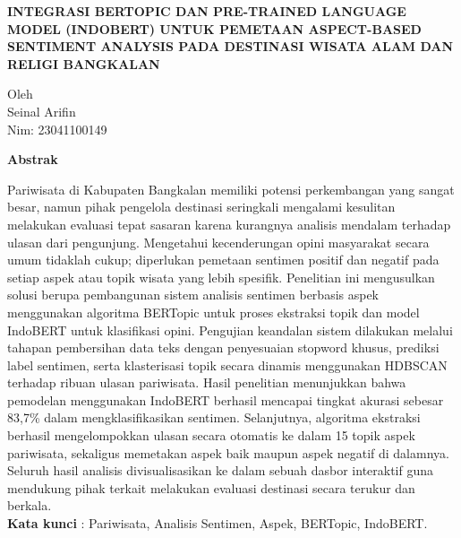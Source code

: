 \begin{center}
    
{\fontsize{16pt}{19pt}\selectfont \textbf{\MakeUppercase{Integrasi BERTopic dan Pre-trained Language Model (IndoBERT) untuk Pemetaan Aspect-Based Sentiment Analysis pada Destinasi Wisata alam dan religi Bangkalan}}}

Oleh \\[3pt]
    Seinal Arifin \\[8pt] %
    Nim: 23041100149
\end{center}
\vspace{2cm}
\begin{center}
  \textbf{\large Abstrak}
\end{center}
\noindent
Pariwisata di Kabupaten Bangkalan memiliki potensi perkembangan yang sangat besar, namun pihak pengelola destinasi seringkali mengalami kesulitan melakukan evaluasi tepat sasaran karena kurangnya analisis mendalam terhadap ulasan dari pengunjung. Mengetahui kecenderungan opini masyarakat secara umum tidaklah cukup; diperlukan pemetaan sentimen positif dan negatif pada setiap aspek atau topik wisata yang lebih spesifik. Penelitian ini mengusulkan solusi berupa pembangunan sistem analisis sentimen berbasis aspek menggunakan algoritma BERTopic untuk proses ekstraksi topik dan model IndoBERT untuk klasifikasi opini. Pengujian keandalan sistem dilakukan melalui tahapan pembersihan data teks dengan penyesuaian stopword khusus, prediksi label sentimen, serta klasterisasi topik secara dinamis menggunakan HDBSCAN terhadap ribuan ulasan pariwisata. Hasil penelitian menunjukkan bahwa pemodelan menggunakan IndoBERT berhasil mencapai tingkat akurasi sebesar 83,7\% dalam mengklasifikasikan sentimen. Selanjutnya, algoritma ekstraksi berhasil mengelompokkan ulasan secara otomatis ke dalam 15 topik aspek pariwisata, sekaligus memetakan aspek baik maupun aspek negatif di dalamnya. Seluruh hasil analisis divisualisasikan ke dalam sebuah dasbor interaktif guna mendukung pihak terkait melakukan evaluasi destinasi secara terukur dan berkala. \\
\noindent
\textbf{Kata kunci} : Pariwisata, Analisis Sentimen, Aspek, BERTopic, IndoBERT.